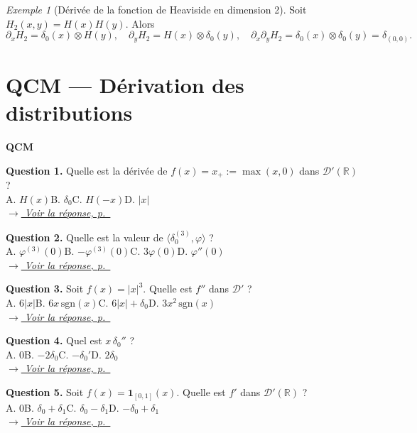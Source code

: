 \documentclass[12pt,a4paper,openany]{book}
\theoremstyle{definition}
\theoremstyle{plain}
\theoremstyle{remark}
\newtheorem*{example}{Exemple}
\newenvironment{exemple}{\begin{example}}{\end{example}}
\newenvironment{qcmblock}{%
	\begin{mdframed}[linewidth=0.5pt, linecolor=black!35,
		backgroundcolor=gray!5,
		skipabove=12pt, skipbelow=12pt,
		innerleftmargin=12pt, innerrightmargin=8pt,
		innertopmargin=8pt, innerbottommargin=8pt]%
		\noindent\textbf{\scshape QCM}\par\smallskip%
	}{%
	\end{mdframed}%
}
\newcommand{\navtoQCMRep}[2]{%
	\vspace{2pt}%
	\noindent\hfill{\small\itshape%
		\hyperlink{qcmrep:#1:q#2}{$\rightarrow$ Voir la réponse, p.~\pageref*{qcmrep:#1:q#2}}%
	}%
	\vspace{6pt}%
}
\begin{document}
	\begin{exemple}[Dérivée de la fonction de Heaviside en dimension 2]
		Soit $H_2(x,y) = H(x)H(y)$. Alors
		\[
		\partial_x H_2 = \delta_0(x) \otimes H(y), \quad
		\partial_y H_2 = H(x) \otimes \delta_0(y), \quad
		\partial_x\partial_y H_2 = \delta_0(x) \otimes \delta_0(y) = \delta_{(0,0)}.
		\]
	\end{exemple}
	
	\section{QCM — Dérivation des distributions}
	
	\begin{qcmblock}
		\hypertarget{qcm:ch3:start}{}\label{qcm:ch3:start}
		\hypertarget{qcm:ch3:q1}{}\label{qcm:ch3:q1}
		\textbf{Question 1.} Quelle est la dérivée de $f(x) = x_+ := \max(x,0)$ dans $\mathcal{D}'(\mathbb{R})$ ?\\
		A. $H(x)$\quad B. $\delta_0$\quad C. $H(-x)$\quad D. $|x|$\\
		\navtoQCMRep{ch3}{1}
		
		\medskip
		\hypertarget{qcm:ch3:q2}{}\label{qcm:ch3:q2}
		\textbf{Question 2.} Quelle est la valeur de $\langle \delta_0^{(3)}, \varphi \rangle$ ?\\
		A. $\varphi^{(3)}(0)$\quad B. $-\varphi^{(3)}(0)$\quad C. $3\varphi(0)$\quad D. $\varphi''(0)$\\
		\navtoQCMRep{ch3}{2}
		
		\medskip
		\hypertarget{qcm:ch3:q3}{}\label{qcm:ch3:q3}
		\textbf{Question 3.} Soit $f(x) = |x|^3$. Quelle est $f''$ dans $\mathcal{D}'$ ?\\
		A. $6|x|$\quad B. $6x\,\mathrm{sgn}(x)$\quad C. $6|x| + \delta_0$\quad D. $3x^2\,\mathrm{sgn}(x)$\\
		\navtoQCMRep{ch3}{3}
		
		\medskip
		\hypertarget{qcm:ch3:q4}{}\label{qcm:ch3:q4}
		\textbf{Question 4.} Quel est $x\,\delta_0''$ ?\\
		A. $0$\quad B. $-2\delta_0$\quad C. $-\delta_0'$\quad D. $2\delta_0$\\
		\navtoQCMRep{ch3}{4}
		
		\medskip
		\hypertarget{qcm:ch3:q5}{}\label{qcm:ch3:q5}
		\textbf{Question 5.} Soit $f(x) = \mathbf{1}_{[0,1]}(x)$. Quelle est $f'$ dans $\mathcal{D}'(\mathbb{R})$ ?\\
		A. $0$\quad B. $\delta_0 + \delta_1$\quad C. $\delta_0 - \delta_1$\quad D. $-\delta_0 + \delta_1$\\
		\navtoQCMRep{ch3}{5}
		

\end{qcmblock}
\end{document}
